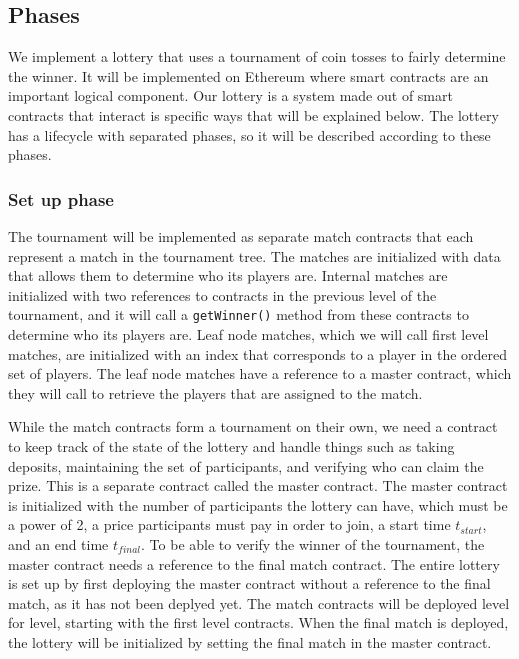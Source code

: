 \subsection{Phases}

We implement a lottery that uses a tournament of coin tosses to fairly determine the winner. It will be implemented on Ethereum where smart contracts are an important logical component. Our lottery is a system made out of smart contracts that interact is specific ways that will be explained below. The lottery has a lifecycle with separated phases, so it will be described according to these phases.

\subsubsection{Set up phase}
The tournament will be implemented as separate match contracts that each represent a match in the tournament tree. The matches are initialized with data that allows them to determine who its players are. Internal matches are initialized with two references to contracts in the previous level of the tournament, and it will call a \texttt{getWinner()} method from these contracts to determine who its players are. Leaf node matches, which we will call first level matches, are initialized with an index that corresponds to a player in the ordered set of players. The leaf node matches have a reference to a master contract, which they will call to retrieve the players that are assigned to the match.

While the match contracts form a tournament on their own, we need a contract to keep track of the state of the lottery and handle things such as taking deposits, maintaining the set of participants, and verifying who can claim the prize. This is a separate contract called the master contract. The master contract is initialized with the number of participants the lottery can have, which must be a power of 2, a price participants must pay in order to join, a start time $t_{start}$, and an end time $t_{final}$. To be able to verify the winner of the tournament, the master contract needs a reference to the final match contract. The entire lottery is set up by first deploying the master contract without a reference to the final match, as it has not been deplyed yet. The match contracts will be deployed level for level, starting with the first level contracts. When the final match is deployed, the lottery will be initialized by setting the final match in the master contract. 


